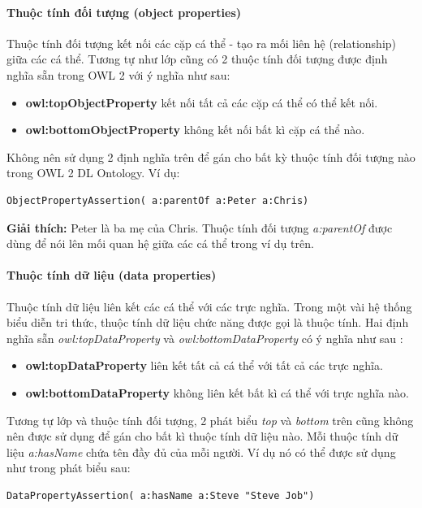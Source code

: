 \paragraph{Thuộc tính đối tượng (object properties)} 
Thuộc tính đối tượng kết nối các cặp cá thể - tạo ra mối liên hệ (relationship) giữa các cá thể. Tương tự như lớp cũng có 2 thuộc tính đối tượng được định nghĩa sẵn trong OWL 2 với ý nghĩa như sau:
\begin{itemize}
	\item \textbf{owl:topObjectProperty} kết nối tất cả các cặp cá thể có thể kết nối.
	\item \textbf{owl:bottomObjectProperty} không kết nối bất kì cặp cá thể nào. 
\end{itemize}
Không nên sử dụng 2 định nghĩa trên để gán cho bất kỳ thuộc tính đối tượng nào trong OWL 2 DL Ontology. Ví dụ:
\begin{verbatim}
ObjectPropertyAssertion( a:parentOf a:Peter a:Chris)  
\end{verbatim}
\textbf{Giải thích:} Peter là ba mẹ của Chris. Thuộc tính đối tượng \textit{a:parentOf} được dùng để nói lên mối quan hệ giữa các cá thể trong ví dụ trên.

\paragraph{Thuộc tính dữ liệu (data properties)}
Thuộc tính dữ liệu liên kết các cá thể với các trực nghĩa. Trong một vài hệ thống biểu diễn tri thức, thuộc tính dữ liệu chức năng được gọi là thuộc tính.
Hai định nghĩa sẵn \textit{owl:topDataProperty} và \textit{owl:bottomDataProperty} có ý nghĩa như sau :
\begin{itemize}
	\item \textbf{owl:topDataProperty} liên kết tất cả cá thể với tất cả các trực nghĩa.
	\item \textbf{owl:bottomDataProperty} không liên kết bất kì cá thể với trực nghĩa nào.
\end{itemize}
Tương tự lớp và thuộc tính đối tượng, 2 phát biểu \textit{top} và \textit{bottom} trên cũng không nên được sử dụng để gán cho bất kì thuộc tính dữ liệu nào. Mỗi thuộc tính dữ liệu \textit{a:hasName} chứa tên đầy đủ của mỗi người. Ví dụ nó có thể được sử dụng như trong phát biểu sau:

\begin{verbatim}
DataPropertyAssertion( a:hasName a:Steve "Steve Job") 
\end{verbatim}

